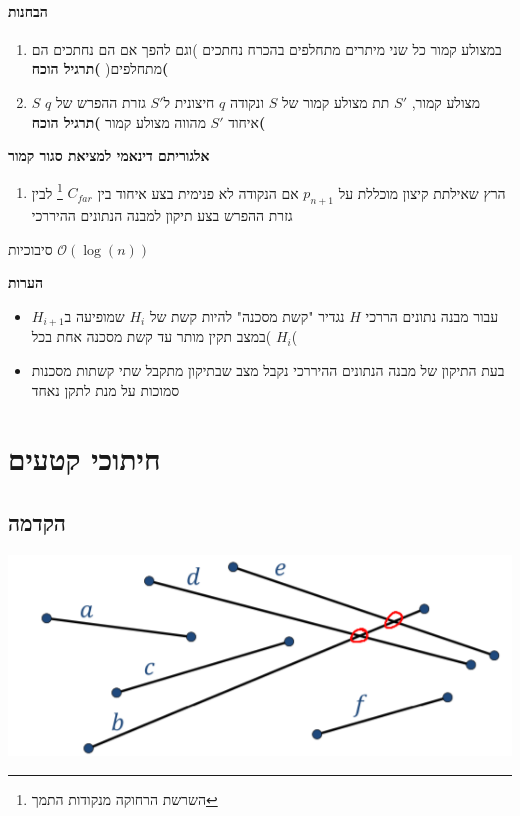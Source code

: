 \documentclass{article}
\makeatletter
\newcommand*{\saved@uline}{}
\let\saved@uline\uline
\newcommand*{\mathuline}{%
  \mathpalette{\math@uline\saved@uline}%
}
\newcommand*{\math@uline}[3]{%
  \mbox{#1{$#2#3\m@th$}}%
}
\renewcommand*{\uline}{%
  \relax  
  \ifmmode
    \expandafter\mathuline
  \else
    \expandafter\saved@uline
  \fi
}
\makeatother
\begin{document}
\paragraph{הבחנות}
\begin{enumerate}
\item במצולע קמור כל שני מיתרים מתחלפים בהכרח נחתכים )וגם להפך אם הם נחתכים הם מתחלפים( \textbf{)תרגיל הוכח(}
\item $S$ מצולע קמור, $S'$ תת מצולע קמור של $S$ ונקודה $q$ חיצונית ל$S'$ גזרת ההפרש של $q$ איחוד $S'$ מהווה מצולע קמור \textbf{)תרגיל הוכח(} 
\end{enumerate}

\textbf{אלגוריתם דינאמי למציאת סגור קמור}
\begin{enumerate}
\item הרץ שאילתת קיצון מוכללת על $p_{n+1}$ אם הנקודה לא פנימית בצע איחוד בין $C_{far}$ \footnote{השרשת הרחוקה מנקודות התמך} לבין גזרת ההפרש בצע תיקון למבנה הנתונים ההיררכי
\end{enumerate}
\uline{סיבוכיות} $\mathcal{O}(\log(n))$

\textbf{הערות}
\begin{itemize}
\item עבור מבנה נתונים הררכי $H$ נגדיר "קשת מסכנה" להיות קשת של $H_i$ שמופיעה ב$H_{i+1}$ )במצב תקין מותר עד קשת מסכנה אחת בכל $H_i$(
\item בעת התיקון של מבנה הנתונים ההיררכי נקבל מצב שבתיקון מתקבל שתי קשתות מסכנות סמוכות על מנת לתקן נאחד 
\end{itemize}


\section{חיתוכי קטעים}
\subsection{הקדמה}
\includegraphics[scale=0.8]{z8.png}
\end{document}

